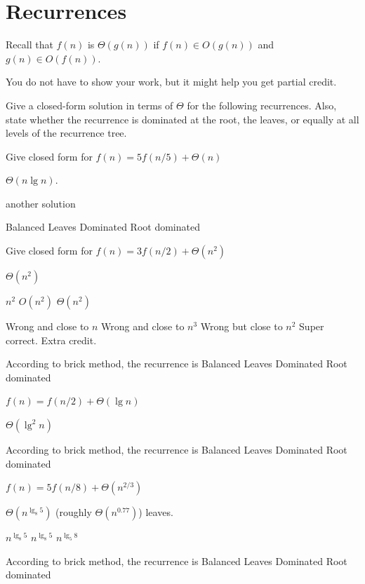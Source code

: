 \section{Recurrences}

Recall that $f(n)$ is $\Theta(g(n))$
if $f(n) \in O(g(n))$ and $g(n) \in O(f(n))$.


\begin{note}
You do not have to show your work, but it might help you get partial credit.
\end{note}

\begin{problem}[40.]
Give a closed-form
solution in terms of $\Theta$ for the following recurrences.  Also, state
whether the recurrence is dominated at the root, the leaves, or
equally at all levels of the recurrence tree.


\ask[10.0]
Give closed form for  
$f(n) = 5f(n/5) + \Theta(n)$


\sol[0.5] 
$\Theta (n \lg n)$.

\sol[1.5]
another solution

\onechoice[8.] 

\choice[1.0] Balanced
\choice[0.4] Leaves Dominated
\choice[0.6] Root dominated 



\ask[2.]
Give closed form for  
$f(n) = 3f(n/2) + \Theta(n^2)$

\sol
$\Theta(n^2)$

\agone
\sc[1.0] $n^2$
\sc[1.0] $O(n^2)$
\sc[1.0] $\Theta(n^2)$ 

\gany
\sc[-0.5] Wrong and close to $n$
\sc[-0.5] Wrong and close to $n^3$
\sc[-0.25] Wrong but close to $n^2$
\sc[+0.25] Super correct.  Extra credit.


\onechoice  According to brick method, the recurrence is
\choice Balanced
\choice Leaves Dominated
\choice* Root dominated

\ask[2.]
$f(n) = f(n/2) + \Theta(\lg n)$

\sol
$\Theta (\lg^2 n)$

\onechoice[10]  According to brick method, the recurrence is
\choice*[1.0] Balanced
\choice[0.2] Leaves Dominated
\choice Root dominated

\ask[2]
$f(n) = 5f(n/8) +\Theta(n^{2/3})$

\sol
$\Theta(n^{\lg_8 5})$ (roughly $\Theta(n^{0.77})$) leaves.

\agone
\sc[1.0] $n^{\lg_8{5}}$
\sc[1.0] $n^{\lg_8 5}$
\sc[0.2] $n^{\lg_5 8}$




\onechoice  According to brick method, the recurrence is
\choice Balanced
\choice* Leaves Dominated
\choice Root dominated

\end{problem}


